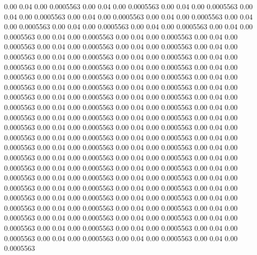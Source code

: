    0.00    0.04    0.00   0.0005563
   0.00    0.04    0.00   0.0005563
   0.00    0.04    0.00   0.0005563
   0.00    0.04    0.00   0.0005563
   0.00    0.04    0.00   0.0005563
   0.00    0.04    0.00   0.0005563
   0.00    0.04    0.00   0.0005563
   0.00    0.04    0.00   0.0005563
   0.00    0.04    0.00   0.0005563
   0.00    0.04    0.00   0.0005563
   0.00    0.04    0.00   0.0005563
   0.00    0.04    0.00   0.0005563
   0.00    0.04    0.00   0.0005563
   0.00    0.04    0.00   0.0005563
   0.00    0.04    0.00   0.0005563
   0.00    0.04    0.00   0.0005563
   0.00    0.04    0.00   0.0005563
   0.00    0.04    0.00   0.0005563
   0.00    0.04    0.00   0.0005563
   0.00    0.04    0.00   0.0005563
   0.00    0.04    0.00   0.0005563
   0.00    0.04    0.00   0.0005563
   0.00    0.04    0.00   0.0005563
   0.00    0.04    0.00   0.0005563
   0.00    0.04    0.00   0.0005563
   0.00    0.04    0.00   0.0005563
   0.00    0.04    0.00   0.0005563
   0.00    0.04    0.00   0.0005563
   0.00    0.04    0.00   0.0005563
   0.00    0.04    0.00   0.0005563
   0.00    0.04    0.00   0.0005563
   0.00    0.04    0.00   0.0005563
   0.00    0.04    0.00   0.0005563
   0.00    0.04    0.00   0.0005563
   0.00    0.04    0.00   0.0005563
   0.00    0.04    0.00   0.0005563
   0.00    0.04    0.00   0.0005563
   0.00    0.04    0.00   0.0005563
   0.00    0.04    0.00   0.0005563
   0.00    0.04    0.00   0.0005563
   0.00    0.04    0.00   0.0005563
   0.00    0.04    0.00   0.0005563
   0.00    0.04    0.00   0.0005563
   0.00    0.04    0.00   0.0005563
   0.00    0.04    0.00   0.0005563
   0.00    0.04    0.00   0.0005563
   0.00    0.04    0.00   0.0005563
   0.00    0.04    0.00   0.0005563
   0.00    0.04    0.00   0.0005563
   0.00    0.04    0.00   0.0005563
   0.00    0.04    0.00   0.0005563
   0.00    0.04    0.00   0.0005563
   0.00    0.04    0.00   0.0005563
   0.00    0.04    0.00   0.0005563
   0.00    0.04    0.00   0.0005563
   0.00    0.04    0.00   0.0005563
   0.00    0.04    0.00   0.0005563
   0.00    0.04    0.00   0.0005563
   0.00    0.04    0.00   0.0005563
   0.00    0.04    0.00   0.0005563
   0.00    0.04    0.00   0.0005563
   0.00    0.04    0.00   0.0005563
   0.00    0.04    0.00   0.0005563
   0.00    0.04    0.00   0.0005563
   0.00    0.04    0.00   0.0005563
   0.00    0.04    0.00   0.0005563
   0.00    0.04    0.00   0.0005563
   0.00    0.04    0.00   0.0005563
   0.00    0.04    0.00   0.0005563
   0.00    0.04    0.00   0.0005563
   0.00    0.04    0.00   0.0005563
   0.00    0.04    0.00   0.0005563
   0.00    0.04    0.00   0.0005563
